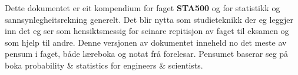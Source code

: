 Dette dokumentet er eit kompendium for faget \textbf{STA500} og for statistikk og sannsynlegheitsrekning generelt. Det blir nytta som studieteknikk der eg leggjer inn det eg ser som hensiktsmessig for seinare repitisjon av faget til eksamen og som hjelp til andre. Denne versjonen av dokumentet inneheld no det meste av pensum i faget, både læreboka og notat frå forelesar. Pensumet baserar seg på boka \startsitat probability \& statistics for engineers \& scientists\sluttsitat \cite{walpole2012probability}. 